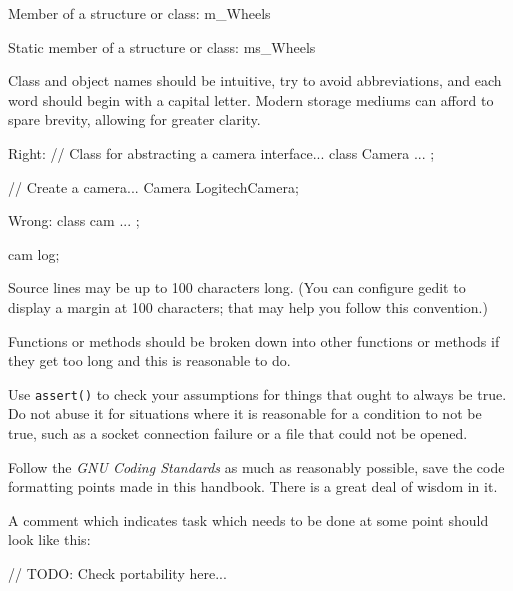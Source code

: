 Member of a structure or class:
\startCodeExample
\starttyping
m_Wheels
\stoptyping
\stopCodeExample

Static member of a structure or class:
\startCodeExample
\starttyping
ms_Wheels
\stoptyping
\stopCodeExample

\item
Class and object names should be intuitive, try to avoid abbreviations, and each word should begin with a capital letter. Modern storage mediums can afford to spare brevity, allowing for greater clarity.


Right:
\startCodeExample
\starttyping
// Class for abstracting a camera interface...
class Camera
{
    ...
};

// Create a camera...
Camera LogitechCamera;
\stoptyping
\stopCodeExample

Wrong:
\startCodeExample
\starttyping
class cam
{
    ...
};

cam log;
\stoptyping
\stopCodeExample

\stopitemize


\startitemize[3]
\setupwhitespace[big]
\item
Source lines may be up to 100 characters long. (You can configure gedit to display a margin at 100 characters; that may help you follow this convention.)

\item
Functions or methods should be broken down into other functions or methods if they get too long and this is reasonable to do.

\item
Use {\tt assert()} to check your assumptions for things that ought to always be true. Do not abuse it for situations where it is reasonable for a condition to not be true, such as a socket connection failure or a file that could not be opened.

\item
Follow the {\it GNU Coding Standards} as much as reasonably possible, save the code formatting points made in this handbook. There is a great deal of wisdom in it.

\item
A comment which indicates task which needs to be done at some point should look like this: 

\startCodeExample
\starttyping
// TODO: Check portability here...
\stoptyping
\stopCodeExample

\stopitemize


